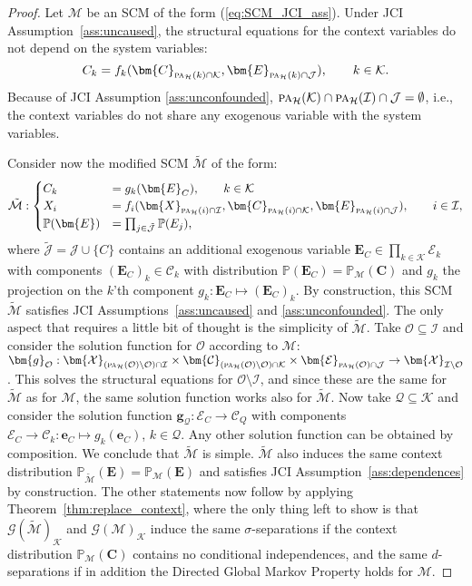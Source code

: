 \documentclass[twoside,11pt]{article}
\newenvironment{customcor}[1]
  {\renewcommand\theinnercustomcor{#1}\innercustomcor}
  {\endinnercustomcor}
\newcommand{\Prb}{\mathbb{P}}
\newcommand\B[1]{\bm{#1}}
\newcommand\C[1]{\mathcal{#1}}
\newcommand\BC[1]{\bm{\mathcal{#1}}}
\newcommand\mathbfsc[1]{\text{\normalfont\scshape#1}}
\newcommand\pasub[2]{\mathbfsc{pa}_{#1}(#2)}
\newcommand\eref[1]{(\ref{#1})}
\begin{document}
\begin{customcor}{\ref{coro:JCI_ass_3}}
\cmdCorollaryJCIAssC
\end{customcor}
\begin{proof}
Let $\C{M}$ be an SCM of the form \eref{eq:SCM_JCI_ass}. Under JCI Assumption~\ref{ass:uncaused}, the structural equations for the context variables do not depend on the system variables:
$$C_k = f_k(\B{C}_{\pasub{\C{H}}{k} \cap \C{K}}, \B{E}_{\pasub{\C{H}}{k} \cap \C{J}}), \qquad k \in \C{K}.$$
Because of JCI Assumption \ref{ass:unconfounded}, $\pasub{\C{H}}{\C{K}} \cap \pasub{\C{H}}{\C{I}} \cap \C{J} = \emptyset$, i.e., the context variables do not share any exogenous variable with the system variables.

Consider now the modified SCM $\tilde{\C{M}}$ of the form:
\begin{equation*}
  \tilde{\C{M}}:
  \begin{cases}
    C_k &= g_k(\B{E}_C), \qquad  k \in \C{K}\\
    X_i &= f_i(\B{X}_{\pasub{\C{H}}{i} \cap \C{I}}, \B{C}_{\pasub{\C{H}}{i} \cap \C{K}}, \B{E}_{\pasub{\C{H}}{i} \cap \C{J}}), \qquad i \in \C{I},\\
    \Prb(\B{E}) & = \prod_{j\in\tilde{\C{J}}} \Prb(E_j),
  \end{cases}
\end{equation*}
where $\tilde{\C{J}} = \C{J} \cup \{C\}$ contains an additional exogenous variable
$\B{E}_C \in \prod_{k\in\C{K}} \C{E}_k$ with components $(\B{E}_C)_k \in \C{C}_k$
with distribution $\Prb(\B{E}_C) = \Prb_{\C{M}}(\B{C})$
and $g_k$ the projection on the $k$'th component $g_k : \B{E}_C \mapsto (\B{E}_C)_k$.
By construction, this SCM $\tilde{\C{M}}$ satisfies JCI Assumptions~\ref{ass:uncaused} and \ref{ass:unconfounded}.
The only aspect that requires a little bit of thought is the simplicity of $\tilde{\C{M}}$.
Take $\C{O} \subseteq \C{I}$ and consider the solution function for $\C{O}$ according to $\C{M}$:
$\B{g}_{\C{O}} : \BC{X}_{(\pasub{\C{H}}{\C{O}}\setminus\C{O})\cap\C{I}} \times \BC{C}_{(\pasub{\C{H}}{\C{O}}\setminus\C{O})\cap\C{K}} \times \BC{E}_{\pasub{\C{H}}{\C{O}} \cap \C{J}} \to \BC{X}_{\C{I} \setminus \C{O}}$.
This solves the structural equations for $\C{O} \setminus \C{I}$, and since these are the same for
$\tilde{\C{M}}$ as for $\C{M}$, the same solution function works also for $\tilde{\C{M}}$. 
Now take $\C{Q} \subseteq \C{K}$ and consider the solution function $\B{g}_{\C{Q}} : \C{E}_C \to \BC{C}_Q$ with
components $\C{E}_C \to \C{C}_k : \B{e}_C \mapsto g_k(\B{e}_C)$, $k \in \C{Q}$. Any other solution function can be
obtained by composition. We conclude that $\tilde{\C{M}}$ is simple.
$\tilde{\C{M}}$ also induces the same context distribution $\Prb_{\tilde{\C{M}}}(\B{E}) = \Prb_{\C{M}}(\B{E})$ and
satisfies JCI Assumption~\ref{ass:dependences} by construction. The other statements now follow by applying 
Theorem~\ref{thm:replace_context}, where the only thing left to show is that
$\C{G}(\tilde{\C{M}})_{\C{K}}$ and $\C{G}(\C{M})_{\C{K}}$ induce the same $\sigma$-separations if
the context distribution $\Prb_{\C{M}}(\B{C})$ contains no conditional independences, and the
same $d$-separations if in addition the Directed Global Markov Property holds for $\C{M}$.


\end{proof}
\end{document}
